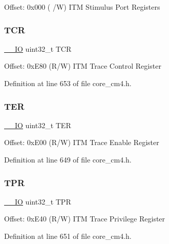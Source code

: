 Offset\+: 0x000 ( /W) I\+TM Stimulus Port Registers \mbox{\label{struct_i_t_m___type_ae9dd9282fab299d0cd6e119564688e53}} 
\subsubsection{\texorpdfstring{T\+CR}{TCR}}
{\footnotesize\ttfamily \hyperlink{group___c_m_s_i_s__core__definitions_gaec43007d9998a0a0e01faede4133d6be}{\+\_\+\+\_\+\+IO} uint32\+\_\+t T\+CR}

Offset\+: 0x\+E80 (R/W) I\+TM Trace Control Register 

Definition at line 653 of file core\+\_\+cm4.\+h.

\mbox{\label{struct_i_t_m___type_a8ffb3c6b706b03334f6fe37ef5d8b165}} 
\subsubsection{\texorpdfstring{T\+ER}{TER}}
{\footnotesize\ttfamily \hyperlink{group___c_m_s_i_s__core__definitions_gaec43007d9998a0a0e01faede4133d6be}{\+\_\+\+\_\+\+IO} uint32\+\_\+t T\+ER}

Offset\+: 0x\+E00 (R/W) I\+TM Trace Enable Register 

Definition at line 649 of file core\+\_\+cm4.\+h.

\mbox{\label{struct_i_t_m___type_a72bb9b7d61fe3262cd2a6070a7bd5b69}} 
\subsubsection{\texorpdfstring{T\+PR}{TPR}}
{\footnotesize\ttfamily \hyperlink{group___c_m_s_i_s__core__definitions_gaec43007d9998a0a0e01faede4133d6be}{\+\_\+\+\_\+\+IO} uint32\+\_\+t T\+PR}

Offset\+: 0x\+E40 (R/W) I\+TM Trace Privilege Register 

Definition at line 651 of file core\+\_\+cm4.\+h.

\mbox{\label{struct_i_t_m___type_ae8d499140220fa6d4eab1da7262bf08e}} 

